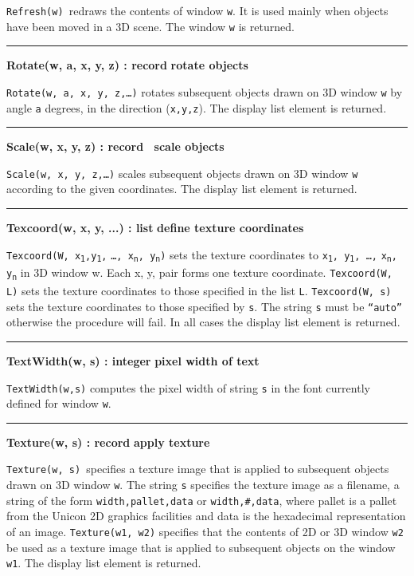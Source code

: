 \noindent
\texttt{Refresh(w) }redraws the contents of window \texttt{w}. It is
used mainly when objects have been moved in a 3D scene. The window
\texttt{w} is returned. 

\bigskip\hrule\vspace{0.1cm}
\noindent
{\bf Rotate(w, a, x, y, z) : record } \hfill {\bf rotate objects}

\noindent
\texttt{Rotate(w, a, x, y, z,{\dots})} rotates subsequent objects drawn
on 3D window \texttt{w} by angle \texttt{a} degrees, in the direction
(\texttt{x,y,z}). The display list element is returned.

\bigskip\hrule\vspace{0.1cm}
\noindent
{\bf Scale(w, x, y, z) : record \hfill\ scale objects}

\noindent
\texttt{Scale(w, x, y, z,{\dots})} scales subsequent objects drawn on 3D
window \texttt{w} according to the given coordinates. The display list
element is returned.

\bigskip\hrule\vspace{0.1cm}
\noindent
{\bf Texcoord(w, x, y, ...) : list } \hfill {\bf define texture coordinates}

\noindent
\texttt{Texcoord(W, x\textsubscript{1},y\textsubscript{1},}
\texttt{{\dots}, x\textsubscript{n}, y\textsubscript{n})}
sets the texture coordinates to
\texttt{x\textsubscript{1}, y\textsubscript{1}, {\dots},}
\texttt{x\textsubscript{n}, y\textsubscript{n}} in
3D window w. Each x, y, pair forms one texture coordinate.
\texttt{Texcoord(W, L)} sets the texture coordinates to those specified
in the list \texttt{L}. \texttt{Texcoord(W, s) }sets the texture
coordinates to those specified by \texttt{s}. The string \texttt{s}
must be \texttt{{\textquotedblleft}auto{\textquotedblright}} otherwise
the procedure will fail. In all cases the display list element is
returned.

\bigskip\hrule\vspace{0.1cm}
\noindent
{\bf TextWidth(w, s) : integer } \hfill {\bf pixel width of text}

\noindent
\texttt{TextWidth(w,s)} computes the pixel width of string \texttt{s} in
the font currently defined for window \texttt{w}.

\bigskip\hrule\vspace{0.1cm}
\noindent
{\bf Texture(w, s) : record } \hfill {\bf apply texture}

\noindent
\texttt{Texture(w, s) }specifies a texture image that is applied to
subsequent objects drawn on 3D window \texttt{w}. The string \texttt{s}
specifies the texture image as a filename, a string of the form
\texttt{width,pallet,data} or \texttt{width,\#,data}, where pallet is a
pallet from the Unicon 2D graphics facilities and data is the
hexadecimal representation of an image. \texttt{Texture(w1, w2)}
specifies that the contents of 2D or 3D window \texttt{w2} be used as
a texture image that is applied to subsequent objects on the window
\texttt{w1}. The display list element is returned.

